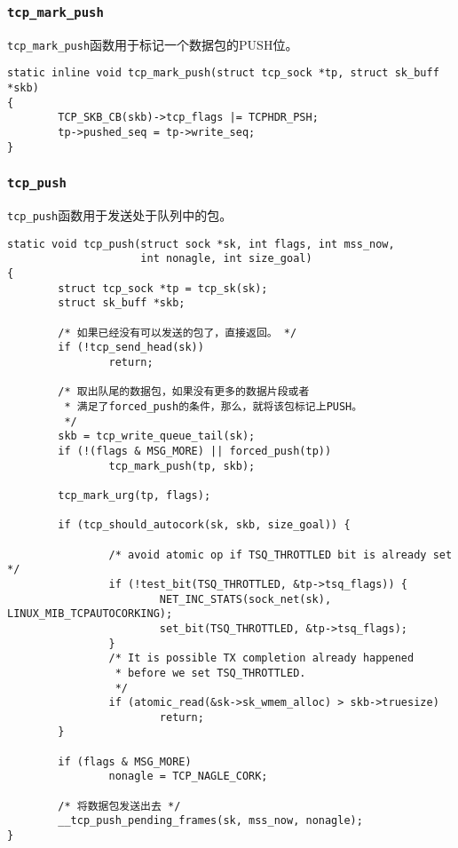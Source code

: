 \subsubsection{\texttt{tcp_mark_push}}
\texttt{tcp_mark_push}函数用于标记一个数据包的PUSH位。
\begin{verbatim}
static inline void tcp_mark_push(struct tcp_sock *tp, struct sk_buff *skb)
{
        TCP_SKB_CB(skb)->tcp_flags |= TCPHDR_PSH;
        tp->pushed_seq = tp->write_seq;
}
\end{verbatim}

\subsubsection{\texttt{tcp_push}}
\texttt{tcp_push}函数用于发送处于队列中的包。
\begin{verbatim}
static void tcp_push(struct sock *sk, int flags, int mss_now,
                     int nonagle, int size_goal)
{
        struct tcp_sock *tp = tcp_sk(sk);
        struct sk_buff *skb;

        /* 如果已经没有可以发送的包了，直接返回。 */
        if (!tcp_send_head(sk))
                return;

        /* 取出队尾的数据包，如果没有更多的数据片段或者
         * 满足了forced_push的条件，那么，就将该包标记上PUSH。 
         */
        skb = tcp_write_queue_tail(sk);
        if (!(flags & MSG_MORE) || forced_push(tp))
                tcp_mark_push(tp, skb);

        tcp_mark_urg(tp, flags);

        if (tcp_should_autocork(sk, skb, size_goal)) {

                /* avoid atomic op if TSQ_THROTTLED bit is already set */
                if (!test_bit(TSQ_THROTTLED, &tp->tsq_flags)) {
                        NET_INC_STATS(sock_net(sk), LINUX_MIB_TCPAUTOCORKING);
                        set_bit(TSQ_THROTTLED, &tp->tsq_flags);
                }
                /* It is possible TX completion already happened
                 * before we set TSQ_THROTTLED.
                 */
                if (atomic_read(&sk->sk_wmem_alloc) > skb->truesize)
                        return;
        }

        if (flags & MSG_MORE)
                nonagle = TCP_NAGLE_CORK;

        /* 将数据包发送出去 */
        __tcp_push_pending_frames(sk, mss_now, nonagle);
}
\end{verbatim}

